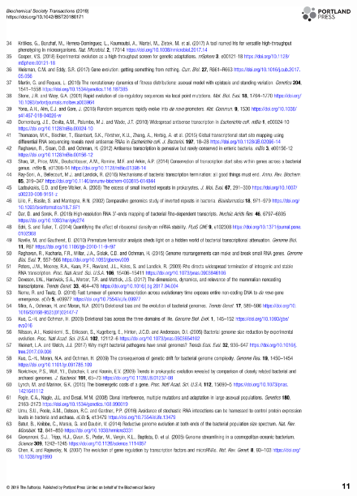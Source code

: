 \begin{figure}
    \centering
    \includegraphics[width=\linewidth]{lit_review/page11.png}
\end{figure}
